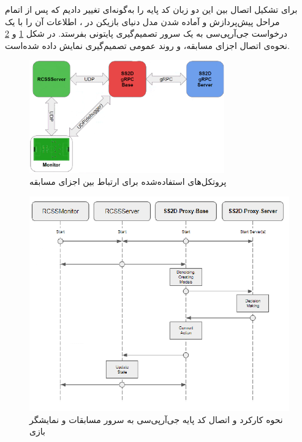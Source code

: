 برای تشکیل اتصال بین این دو زبان کد پایه  را به‌گونه‌ای تغییر دادیم که
پس از اتمام مراحل پیش‌پردازش و آماده شدن مدل دنیای بازیکن
در ،
اطلاعات آن را با یک درخواست جی‌آرپی‌سی
به یک سرور تصمیم‌گیری پایتونی بفرستد.
در شکل \ref{fig:connection} و \ref{fig:grpc_base}
نحوه‌ی اتصال اجزای مسابقه، و روند عمومی تصمیم‌گیری نمایش داده شده‌است.

\begin{figure}[H]
    \centering
    \includegraphics[width=0.75\textwidth]{images/connection_protocols.png}
    \caption{پروتکل‌های استفاده‌شده برای ارتباط بین اجزای مسابقه}\label{fig:connection}
    
\end{figure}

\begin{figure}[H]
    \centering
    \includegraphics[width=1\textwidth]{images/grpc_base.png}
    \caption{نحوه کارکرد و اتصال کد پایه جی‌آر‌پی‌سی به سرور مسابقات و نمایشگر بازی}\label{fig:grpc_base}
    
\end{figure}
